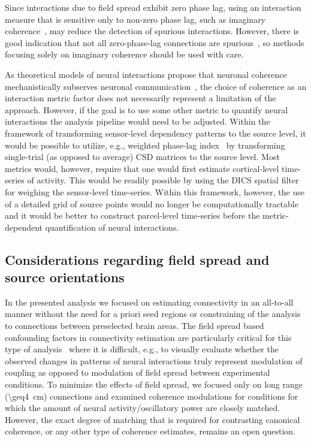 \documentclass[utf8]{frontiersSCNS}
\renewcommand{\cite}[1]{~\citep{#1}}
\begin{document}
Since interactions due to field spread exhibit zero phase lag, using an interaction measure that is sensitive only to non-zero phase lag, such as imaginary coherence\cite{Nolte2004, Drakesmith2013}, may reduce the detection of spurious interactions.
However, there is good indication that not all zero-phase-lag connections are spurious\cite{Gollo2014}, so methods focusing solely on imaginary coherence should be used with care.

As theoretical models of neural interactions propose that neuronal coherence mechanistically subserves neuronal communication\cite{Fries2005}, the choice of coherence as an interaction metric factor does not necessarily represent a limitation of the approach.
However, if the goal is to use some other metric to quantify neural interactions the analysis pipeline would need to be adjusted.
Within the framework of transforming sensor-level dependency patterns to the source level, it would be possible to utilize, e.g., weighted phase-lag index\cite{Vinck2011} by transforming single-trial (as opposed to average) CSD matrices to the source level.
Most metrics would, however, require that one would first estimate cortical-level time-series of activity.
This would be readily possible by using the DICS spatial filter for weighing the sensor-level time-series.
Within this framework, however, the use of a detailed grid of source points would no longer be computationally tractable and it would be better to construct parcel-level time-series before the metric-dependent quantification of neural interactions.

\subsection{Considerations regarding field spread and source orientations}

In the presented analysis we focused on estimating connectivity in an all-to-all manner without the need for a priori seed regions or constraining of the analysis to connections between preselected brain areas.
The field spread based confounding factors in connectivity estimation are particularly critical for this type of analysis\cite{Schoffelen2009a} where it is difficult, e.g., to visually evaluate whether the observed changes in patterns of neural interactions truly represent modulation of coupling as opposed to modulation of field spread between experimental conditions.
To minimize the effects of field spread, we focused only on long range (\SI{\geq4}{\centi\meter}) connections and examined coherence modulations for conditions for which the amount of neural activity/oscillatory power are closely matched.
However, the exact degree of matching that is required for contrasting canonical coherence, or any other type of coherence estimates, remains an open question.
\end{document}
